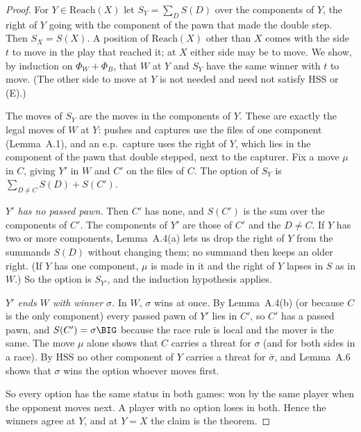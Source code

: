 \begin{proof}
For $Y\in\mathrm{Reach}(X)$ let $S_Y=\sum_D S(D)$ over the components of $Y$, the right of $Y$ going with the component
of the pawn that made the double step. Then $S_X=S(X)$. A position of $\mathrm{Reach}(X)$ other than $X$ comes with the side $t$ to move in the play that reached it; at $X$ either side may be to move. We show, by induction on $\Phi_W+\Phi_B$, that $W$ at $Y$ and
$S_Y$ have the same winner with $t$ to move. (The other side to move at $Y$ is not needed and need not satisfy HSS or (E).)

The moves of $S_Y$ are the moves in the components of $Y$. These are exactly the legal moves of $W$ at $Y$: pushes and
captures use the files of one component (Lemma~A.1), and an e.p.\ capture uses the right of $Y$, which lies in the
component of the pawn that double stepped, next to the capturer. Fix a move $\mu$ in $C$, giving $Y'$ in $W$ and $C'$ on
the files of $C$. The option of $S_Y$ is $\sum_{D\ne C}S(D)+S(C')$.

\emph{$Y'$ has no passed pawn.} Then $C'$ has none, and $S(C')$ is the sum over the components of $C'$. The components of
$Y'$ are those of $C'$ and the $D\ne C$. If $Y$ has two or more components, Lemma~A.4(a) lets us drop the right of $Y$
from the summands $S(D)$ without changing them; no summand then keeps an older right. (If $Y$ has one component, $\mu$ is made in it and the right of $Y$ lapses in $S$ as in $W$.) So the option is $S_{Y'}$, and the induction hypothesis applies.

\emph{$Y'$ ends $W$ with winner $\sigma$.} In $W$, $\sigma$ wins at once. By Lemma~A.4(b) (or because $C$ is the only
component) every passed pawn of $Y'$ lies in $C'$, so $C'$ has a passed pawn, and $S(C')=\sigma\BIG$ because the race rule
is local and the mover is the same. The move $\mu$ alone shows that $C$ carries a threat for $\sigma$ (and for both sides
in a race). By HSS no other component of $Y$ carries a threat for $\bar\sigma$, and Lemma~A.6 shows that $\sigma$ wins the
option whoever moves first.

So every option has the same status in both games: won by the same player when the opponent moves next. A player with no
option loses in both. Hence the winners agree at $Y$, and at $Y=X$ the claim is the theorem.
\end{proof}

